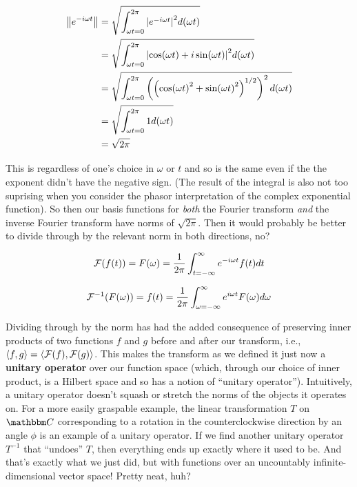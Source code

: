 \documentclass[../main/main.tex]{subfiles}
\begin{document}
\[\begin{split}
  \norm{e^{-i\omega t}} &= \sqrt{\int_{\omega t=0}^{2\pi} \abs{e^{-i\omega t}}^2 d(\omega t)} \\
  &= \sqrt{\int_{\omega t=0}^{2\pi} \abs{\cos(\omega t) + i\sin(\omega t)}^2 d(\omega t)} \\
  &= \sqrt{\int_{\omega t=0}^{2\pi}
  \left(
    \left(\cos(\omega t)^2 + \sin(\omega t)^2\right)^{1/2}
    \right)^2 
    d(\omega t)} \\
  &= \sqrt{\int_{\omega t=0}^{2\pi} 1 d(\omega t)} \\
  &= \sqrt{2\pi}
\end{split}\]

This is regardless of one's choice in \(\omega\) or \(t\) and
so is the same even if the the exponent didn't have the
negative sign.
(The result of the integral is
also not too suprising when you consider the phasor interpretation of the complex exponential function).
So then our basis functions for \emph{both} the Fourier
transform \emph{and} the inverse Fourier transform have
norms of \(\sqrt{2\pi}\). Then it would probably be better
to divide through by the relevant norm in both directions, no?

\[\mathcal{F}(f(t)) = F(\omega)
  = \frac{1}{2\pi} \int_{t=-\infty}^{\infty} e^{-i\omega t} f(t) dt\]

\[\mathcal{F}^{-1}(F(\omega)) = f(t)
  = \frac{1}{2\pi} \int_{\omega=-\infty}^{\infty} e^{i\omega t} F(\omega) d\omega\]

Dividing through by the norm has had the added consequence
of preserving inner products of two functions \(f\) and \(g\)
before and after our transform, i.e., 
\(\left<f,g\right> = \left<\mathcal{F}(f),\mathcal{F}(g)\right>\).
This makes the transform as we defined it just now a
\textbf{unitary operator} over
our function space (which, through our choice of inner product,
is a Hilbert space and so has a notion of ``unitary operator'').
Intuitively, a unitary operator doesn't squash or stretch
the norms of the objects it operates on. For a more easily
graspable example, the linear transformation \(T\)
on \(\domain{C}\)
corresponding to a rotation in the counterclockwise direction
by an angle \(\phi\) is an example of a unitary operator.
If we find another unitary operator \(T^{-1}\) 
that ``undoes'' \(T\), then everything ends up exactly where
it used to be. And that's exactly what we just did,
but with functions 
over an uncountably infinite-dimensional vector space!
Pretty neat, huh?
\end{document}
